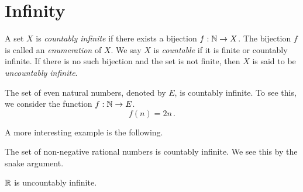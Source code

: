 \section{Infinity}

\begin{definition}
    A set $X$ is \emph{countably infinite} if there exists a bijection $f: \mathbb{N} \to X$.
    The bijection $f$ is called an \emph{enumeration} of $X$.
    We say $X$ is \emph{countable} if it is finite or countably infinite.
    If there is no such bijection and the set is not finite, then $X$ is said to be
    \emph{uncountably infinite}.
\end{definition}

\begin{example}
   The set of even natural numbers, denoted by $E$, is countably infinite. 
   To see this, we consider the function $f:\mathbb{N} \to E$.
   \begin{equation*}
       f(n) = 2n \,.
   \end{equation*}
\end{example}

A more interesting example is the following.

\begin{example}
    The set of non-negative rational numbers is countably infinite.
    We see this by the snake argument.
\end{example}

\begin{theorem}
   $\mathbb{R}$ is uncountably infinite. 
\end{theorem}


